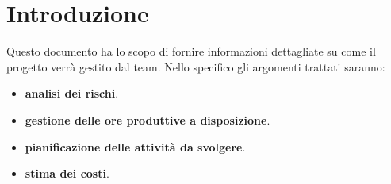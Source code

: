 \section{Introduzione}
\label{sec:introduzione}
Questo documento ha lo scopo di fornire informazioni dettagliate su come il progetto verrà gestito dal team.
Nello specifico gli argomenti trattati saranno:
\begin{itemize}
    \item \textbf{analisi dei rischi}.
    \item \textbf{gestione delle ore produttive a disposizione}.
    \item \textbf{pianificazione delle attività da svolgere}.
    \item \textbf{stima dei costi}.
\end{itemize}